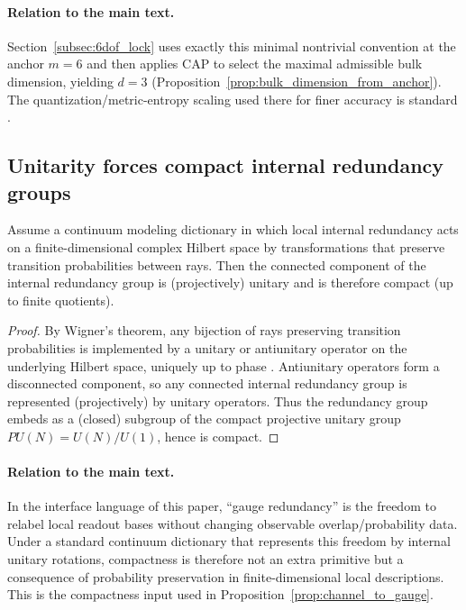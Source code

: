 \paragraph{Relation to the main text.}
Section~\ref{subsec:6dof_lock} uses exactly this minimal nontrivial convention at the anchor $m=6$ and then applies CAP to select the maximal admissible bulk dimension, yielding $d=3$ (Proposition~\ref{prop:bulk_dimension_from_anchor}).
The quantization/metric-entropy scaling used there for finer accuracy is standard \cite{GrayNeuhoff1998Quantization,CoverThomas2006}.

\subsection{Unitarity forces compact internal redundancy groups}
\label{subsec:forced_unitary_compact}

\begin{proposition}
\label{prop:unitary_implies_compact_redundancy}
Assume a continuum modeling dictionary in which local internal redundancy acts on a finite-dimensional complex Hilbert space by transformations that preserve transition probabilities between rays.
Then the connected component of the internal redundancy group is (projectively) unitary and is therefore compact (up to finite quotients).
\end{proposition}
\begin{proof}
By Wigner's theorem, any bijection of rays preserving transition probabilities is implemented by a unitary or antiunitary operator on the underlying Hilbert space, uniquely up to phase \cite{Wigner1931,StreaterWightman1989,WeinbergQFT1995}.
Antiunitary operators form a disconnected component, so any connected internal redundancy group is represented (projectively) by unitary operators.
Thus the redundancy group embeds as a (closed) subgroup of the compact projective unitary group $PU(N)=U(N)/U(1)$, hence is compact.
\end{proof}

\paragraph{Relation to the main text.}
In the interface language of this paper, ``gauge redundancy'' is the freedom to relabel local readout bases without changing observable overlap/probability data.
Under a standard continuum dictionary that represents this freedom by internal unitary rotations, compactness is therefore not an extra primitive but a consequence of probability preservation in finite-dimensional local descriptions.
This is the compactness input used in Proposition~\ref{prop:channel_to_gauge}.


